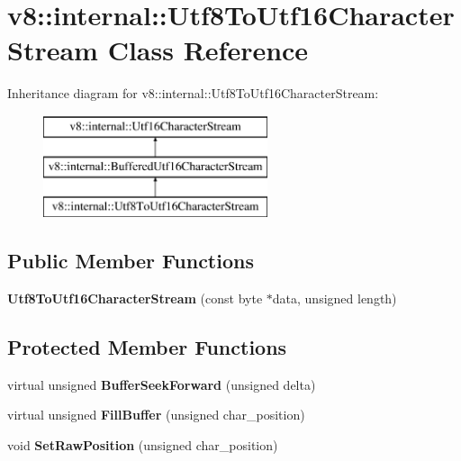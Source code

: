 \hypertarget{classv8_1_1internal_1_1_utf8_to_utf16_character_stream}{}\section{v8\+:\+:internal\+:\+:Utf8\+To\+Utf16\+Character\+Stream Class Reference}
\label{classv8_1_1internal_1_1_utf8_to_utf16_character_stream}
Inheritance diagram for v8\+:\+:internal\+:\+:Utf8\+To\+Utf16\+Character\+Stream\+:\begin{figure}[H]
\begin{center}
\leavevmode
\includegraphics[height=3.000000cm]{classv8_1_1internal_1_1_utf8_to_utf16_character_stream}
\end{center}
\end{figure}
\subsection*{Public Member Functions}
\begin{DoxyCompactItemize}
\item 
\hypertarget{classv8_1_1internal_1_1_utf8_to_utf16_character_stream_a3e85029515552815964d76c615bedff8}{}{\bfseries Utf8\+To\+Utf16\+Character\+Stream} (const byte $\ast$data, unsigned length)\label{classv8_1_1internal_1_1_utf8_to_utf16_character_stream_a3e85029515552815964d76c615bedff8}

\end{DoxyCompactItemize}
\subsection*{Protected Member Functions}
\begin{DoxyCompactItemize}
\item 
\hypertarget{classv8_1_1internal_1_1_utf8_to_utf16_character_stream_a488bdc912e97a46edbc310446cae7d41}{}virtual unsigned {\bfseries Buffer\+Seek\+Forward} (unsigned delta)\label{classv8_1_1internal_1_1_utf8_to_utf16_character_stream_a488bdc912e97a46edbc310446cae7d41}

\item 
\hypertarget{classv8_1_1internal_1_1_utf8_to_utf16_character_stream_a2b6dd0e6a54c3f7d5ea898a406605740}{}virtual unsigned {\bfseries Fill\+Buffer} (unsigned char\+\_\+position)\label{classv8_1_1internal_1_1_utf8_to_utf16_character_stream_a2b6dd0e6a54c3f7d5ea898a406605740}

\item 
\hypertarget{classv8_1_1internal_1_1_utf8_to_utf16_character_stream_adc216a81b2ff499440915c347be7a066}{}void {\bfseries Set\+Raw\+Position} (unsigned char\+\_\+position)\label{classv8_1_1internal_1_1_utf8_to_utf16_character_stream_adc216a81b2ff499440915c347be7a066}

\end{DoxyCompactItemize}
